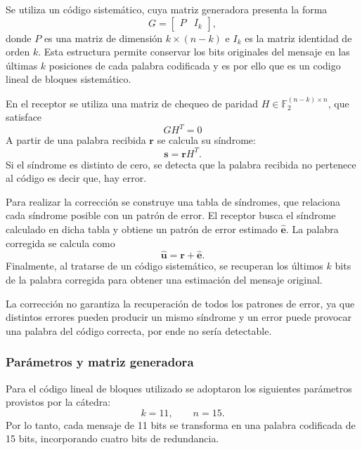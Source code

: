 Se utiliza un código sistemático, cuya matriz generadora
presenta la forma
\begin{equation}
    G=
    \begin{bmatrix}
        P & I_k
    \end{bmatrix},
\end{equation}
donde $P$ es una matriz de dimensión $k\times(n-k)$
e $I_k$ es la matriz identidad de orden $k$.
Esta estructura permite conservar los bits originales del
mensaje en las últimas $k$ posiciones de cada palabra codificada y es por ello que es un codigo lineal de bloques
sistemático.

En el receptor se utiliza una matriz de chequeo de paridad
$H\in\mathbb{F}_2^{(n-k)\times n}$, que satisface
\begin{equation}
    GH^T=0
\end{equation}
A partir de una palabra recibida $\mathbf{r}$ se calcula
su síndrome:
\begin{equation}
    \mathbf{s}=\mathbf{r} H^T .
    \label{eq:sindrome_canal}
\end{equation}
Si el síndrome es distinto de cero, se detecta que la palabra
recibida no pertenece al código es decir que, hay error.

Para realizar la corrección se construye una tabla de síndromes,
que relaciona cada síndrome posible con un patrón de error.
El receptor busca el síndrome calculado en dicha tabla y
obtiene un patrón de error estimado $\hat{\mathbf{e}}$.
La palabra corregida se calcula como
\begin{equation}
    \hat{\mathbf{u}}=
    \mathbf{r}+\hat{\mathbf{e}}.
\end{equation}
Finalmente, al tratarse de un código sistemático, se recuperan
los últimos $k$ bits de la palabra corregida para obtener
una estimación del mensaje original.

La corrección no garantiza la recuperación de todos los patrones de error, ya que
distintos errores pueden producir un mismo síndrome y un error puede provocar una palabra del código correcta,
por ende no sería detectable.

\subsubsection{Parámetros y matriz generadora}

Para el código lineal de bloques utilizado se adoptaron
los siguientes parámetros provistos por la cátedra:
\begin{equation}
    k=11,\qquad n=15.
\end{equation}
Por lo tanto, cada mensaje de 11 bits se transforma en una
palabra codificada de 15 bits, incorporando cuatro bits
de redundancia.

